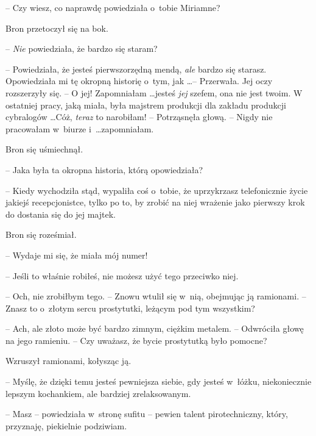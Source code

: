 \documentclass[oneside,polish,11pt,rmheadings]{mwbk}
\begin{document}
-- Czy wiesz, co naprawdę powiedziała o~tobie Miriamne? 

Bron przetoczył się na bok. 

-- \textit{Nie }powiedziała, że bardzo się staram? 

-- Powiedziała, że jesteś pierwszorzędną mendą, \textit{ale }bardzo się starasz. Opowiedziała mi tę okropną historię o~tym, jak \ldots  -- Przerwała. Jej oczy rozszerzyły się. -- O jej! Zapomniałam \ldots  jesteś \textit{jej }szefem, ona nie jest twoim. W ostatniej pracy, jaką miała, była majstrem produkcji dla zakładu produkcji cybralogów \ldots  Cóż, \textit{teraz }to narobiłam! -- Potrząsnęła głową. -- Nigdy nie pracowałam w~biurze i~\ldots  zapomniałam. 

Bron się uśmiechnął. 

-- Jaka była ta okropna historia, którą opowiedziała? 

-- Kiedy wychodziła stąd, wypaliła coś o~tobie, że uprzykrzasz telefonicznie życie jakiejś recepcjonistce, tylko po to, by zrobić na niej wrażenie jako pierwszy krok do dostania się do jej majtek. 

Bron się roześmiał. 

-- Wydaje mi się, że miała mój numer! 

-- Jeśli to właśnie robiłeś, nie możesz użyć tego przeciwko niej. 

-- Och, nie zrobiłbym tego. -- Znowu wtulił się w~nią, obejmując ją ramionami. -- Znasz to o~złotym sercu prostytutki, leżącym pod tym wszystkim? 

-- Ach, ale złoto może być bardzo zimnym, ciężkim metalem. -- Odwróciła głowę na jego ramieniu. -- Czy uważasz, że bycie prostytutką było pomocne? 

Wzruszył ramionami, kołysząc ją. 

-- Myślę, że dzięki temu jesteś pewniejsza siebie, gdy jesteś w~łóżku, niekoniecznie lepszym kochankiem, ale bardziej zrelaksowanym. 

-- Masz -- powiedziała w~stronę sufitu -- pewien talent pirotechniczny, który, przyznaję, piekielnie podziwiam. 
\end{document}
